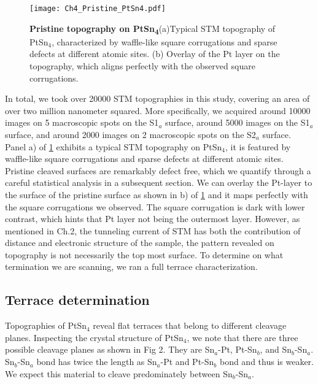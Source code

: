 \begin{figure}
	\centering
	\texttt{[image: Ch4\_Pristine\_PtSn4.pdf]}
	\caption[\textbf{Pristine topography on PtSn\textsubscript{4}}]{\textbf{Pristine topography on PtSn\textsubscript{4}}(a)Typical STM topography of PtSn$_4$, characterized by waffle-like square corrugations and sparse defects at different atomic sites. (b) Overlay of the Pt layer on the topography, which aligns perfectly with the observed square corrugations.}
	\label{fig:ch4_pristinetopo}
\end{figure}

\par In total, we took over 20000 STM topographies in this study, covering an area of over two million nanometer squared. More specifically, we acquired around 10000 images on 5 macroscopic spots on the S1$_a$ surface, around 5000 images on the S1$_a$ surface, and around 2000 images on 2 macroscopic spots on the S2$_a$ surface. 
Panel a) of \ref{fig:ch4_pristinetopo} exhibits a typical STM topography on PtSn$_4$, it is featured by waffle-like square corrugations and sparse defects at different atomic sites. Pristine cleaved surfaces are remarkably defect free, which we quantify through a careful statistical analysis in a subsequent section. We can overlay the Pt-layer to the surface of the pristine surface as shown in b) of \ref{fig:ch4_pristinetopo} and it maps perfectly with the square corrugations we observed. The square corrugation is dark with lower contrast, which hints that Pt layer not being the outermost layer. However, as mentioned in Ch.2, the tunneling current of STM has both the contribution of distance and electronic structure of the sample, the pattern revealed on topography is not necessarily the top most surface. To determine on what termination we are scanning, we ran a full terrace characterization.


\subsection{Terrace determination}
\par Topographies of PtSn$_4$ reveal flat terraces that belong to different cleavage planes. Inspecting the crystal structure of PtSn$_4$, we note that there are three possible cleavage planes as shown in Fig 2. They are Sn$_a$-Pt, Pt-Sn$_b$, and Sn$_b$-Sn$_a$. Sn$_b$-Sn$_a$ bond has twice the length as Sn$_a$-Pt and Pt-Sn$_b$ bond and thus is weaker. We expect this material to cleave predominately between Sn$_b$-Sn$_a$. 

